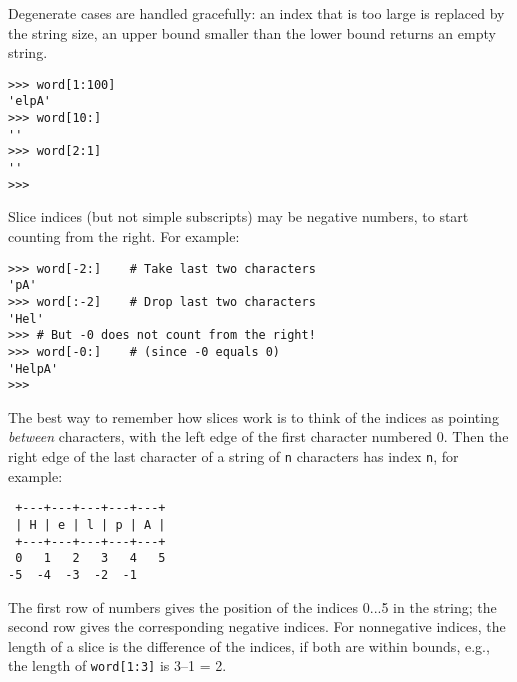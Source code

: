 Degenerate cases are handled gracefully: an index that is too large is
replaced by the string size, an upper bound smaller than the lower bound
returns an empty string.
\bcode\begin{verbatim}
>>> word[1:100]
'elpA'
>>> word[10:]
''
>>> word[2:1]
''
>>>
\end{verbatim}\ecode
Slice indices (but not simple subscripts) may be negative numbers, to
start counting from the right.
For example:
\bcode\begin{verbatim}
>>> word[-2:]    # Take last two characters
'pA'
>>> word[:-2]    # Drop last two characters
'Hel'
>>> # But -0 does not count from the right!
>>> word[-0:]    # (since -0 equals 0)
'HelpA'
>>>
\end{verbatim}\ecode
The best way to remember how slices work is to think of the indices as
pointing
{\em between}
characters, with the left edge of the first character numbered 0.
Then the right edge of the last character of a string of
{\tt n}
characters has index
{\tt n},
for example:
\bcode\begin{verbatim}
 +---+---+---+---+---+
 | H | e | l | p | A |
 +---+---+---+---+---+
 0   1   2   3   4   5
-5  -4  -3  -2  -1
\end{verbatim}\ecode
The first row of numbers gives the position of the indices 0...5 in the
string; the second row gives the corresponding negative indices.
For nonnegative indices, the length of a slice is the difference of the
indices, if both are within bounds,
e.g.,
the length of
{\tt word[1:3]}
is 3--1 = 2.

